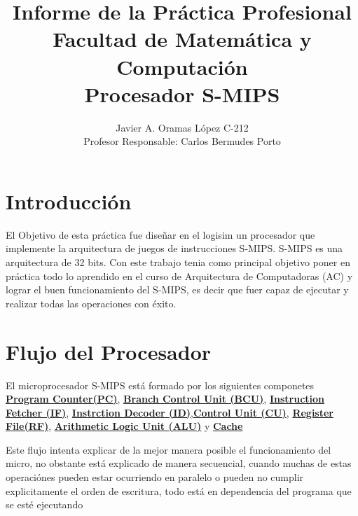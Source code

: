 \documentclass{article}
\author{Javier A. Oramas L\'opez C-212\\ Profesor Responsable: Carlos Bermudes Porto}
\title{Informe de la Práctica Profesional Facultad de Matemática y Computación\\ Procesador S-MIPS}
\begin{document}
    
    \maketitle

    \section{Introducci\'on}
        El Objetivo de esta práctica fue diseñar en el logisim un procesador que implemente la arquitectura de juegos de instrucciones S-MIPS. S-MIPS es una arquitectura de 32 bits. Con este trabajo tenia como principal objetivo poner en práctica todo lo aprendido en el curso de Arquitectura de Computadoras (AC) y lograr el buen funcionamiento del S-MIPS, es decir que fuer capaz de ejecutar y realizar todas las operaciones con éxito.

    
    \section{Flujo del Procesador}
        El microprocesador S-MIPS est\'a formado por los siguientes componetes \hyperref[sec:PC]{\textbf{Program Counter(PC)}},
        \hyperref[sec:BCU]{\textbf{Branch Control Unit (BCU)}}, \hyperref[sec:IF]{\textbf{Instruction Fetcher (IF)}},
        \hyperref[sec:ID]{\textbf{Instrction Decoder (ID)}},\hyperref[sec:CU]{\textbf{Control Unit (CU)}}, \hyperref[sec:RF]{\textbf{Register File(RF)}},
        \hyperref[sec:ALU]{\textbf{Arithmetic Logic Unit (ALU)}} y \hyperref[sec:Cache]{\textbf{Cache}}

        Este flujo intenta explicar de la mejor manera posible el funcionamiento del micro, no obstante est\'a explicado de manera secuencial, cuando muchas de estas operaci\'ones pueden estar ocurriendo en paralelo
        o pueden no cumplir explicitamente el orden de escritura, todo est\'a en dependencia del programa que se est\'e ejecutando
\end{document}
